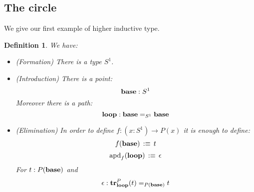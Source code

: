 \documentclass{article}
\newcommand{\sse}[1]{\medbreak \subsection{#1}}
\newcommand{\U}{{\mathcal U}}
\renewcommand{\r}{\rightarrow}
\newcommand{\apd}{\mathrm{apd}}
\newcommand{\tr}{\mathrm{\bf tr}}
\newcommand{\fib}{\mathrm{\bf fib}}
\newcommand{\base}{\mathrm{\bf base}}
\renewcommand{\loop}{\mathrm{\bf loop}}
\newcommand{\one}{{\bf 1}}
\newcommand{\Eq}{\mathrm{Eq}}
\newtheorem{lemma}{Lemma}
\newtheorem{definition}{Definition}
\newcommand{\comment}[1]{}
\begin{document}
\comment{



\begin{lemma}
Assume given $A:\U$ with $a:A$. Assume given $\Eq_A : A\r \U$ with $q : \Eq_A(a)$. Then if:
\[(x:A)\times \Eq_A(x)\]
is contractible, we have for all $x:A$:
\[\Eq_A(x) \simeq a=_A x\]
\end{lemma}
\begin{proof}
We consider the map: 
\[p_1:(x:A)\times \Eq_A(x)\r A\]
We denote by $*_a : \one \r A$ the map defined by $*_A(x) :\equiv a$. We want to show that:
$*_a=_{\U_{/A}} p_1$
\begin{itemize}
\item By the characterization of identity types in it is enough to find an equivalence:
\[\phi : \one \r (x:A)\times \Eq_A(x)\] 
such that $p_1\circ \phi \sim *_a$.
\item We define $\phi$ by induction:
\[\phi(*) \, :\equiv \, (a,q)\]
\item It is immediate to check by induction that $p_1\circ \phi \sim *_a$.
\item The map $\phi$ is an equivalence because any map between contractible type is an equivalence.
\end{itemize}
So we know that for all $b:A$ we have
\[\fib_{*_a}(b)\, \simeq\, \fib_{p_1}(b)\]
From the Grothendieck we know that:
\[\fib_{p_1}(b) \, \simeq \, \Eq_A(b)\]
Now we see:
\[\fib_{*_a}(b) \ \equiv\  (x:\one)\times (*_a(x)=_Ab) \]
\[\ \equiv\  \one\times (a=_Ab) \]
\[\ \simeq\ a=_Ab\]
So we can conclude.
\end{proof}
}


\sse{The circle}

We give our first example of higher inductive type.

\begin{definition}
We have:
\begin{itemize}
\item (Formation) There is a type $S^1$.
\item (Introduction) There is a point: \[\base : S^1\] 
Moreover there is a path: \[\loop : \base=_{S^1}\base\]
\item (Elimination) In order to define $f:(x:S^1) \r P(x)$ it is enough to define:
\[f(\base) \, :\equiv\, t \]
\[\apd_f(\loop) \, :\equiv\, \epsilon\]
For $t:P(\base)$ and 
\[\epsilon : \tr^P_\loop(t) =_{P(\base)} t\]%
\end{itemize}
\end{definition}
\end{document}
